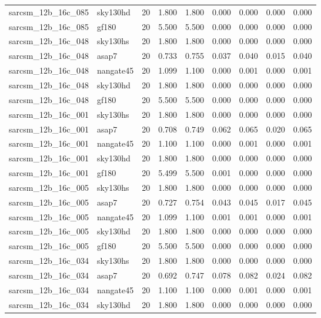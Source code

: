 \begin{tabular}{llrrrrrrr}
sarcsm\_12b\_16c\_085 & sky130hd & 20 & 1.800 & 1.800 & 0.000 & 0.000 & 0.000 & 0.000 \\
sarcsm\_12b\_16c\_085 & gf180 & 20 & 5.500 & 5.500 & 0.000 & 0.000 & 0.000 & 0.000 \\
sarcsm\_12b\_16c\_048 & sky130hs & 20 & 1.800 & 1.800 & 0.000 & 0.000 & 0.000 & 0.000 \\
sarcsm\_12b\_16c\_048 & asap7 & 20 & 0.733 & 0.755 & 0.037 & 0.040 & 0.015 & 0.040 \\
sarcsm\_12b\_16c\_048 & nangate45 & 20 & 1.099 & 1.100 & 0.000 & 0.001 & 0.000 & 0.001 \\
sarcsm\_12b\_16c\_048 & sky130hd & 20 & 1.800 & 1.800 & 0.000 & 0.000 & 0.000 & 0.000 \\
sarcsm\_12b\_16c\_048 & gf180 & 20 & 5.500 & 5.500 & 0.000 & 0.000 & 0.000 & 0.000 \\
sarcsm\_12b\_16c\_001 & sky130hs & 20 & 1.800 & 1.800 & 0.000 & 0.000 & 0.000 & 0.000 \\
sarcsm\_12b\_16c\_001 & asap7 & 20 & 0.708 & 0.749 & 0.062 & 0.065 & 0.020 & 0.065 \\
sarcsm\_12b\_16c\_001 & nangate45 & 20 & 1.100 & 1.100 & 0.000 & 0.001 & 0.000 & 0.001 \\
sarcsm\_12b\_16c\_001 & sky130hd & 20 & 1.800 & 1.800 & 0.000 & 0.000 & 0.000 & 0.000 \\
sarcsm\_12b\_16c\_001 & gf180 & 20 & 5.499 & 5.500 & 0.001 & 0.000 & 0.000 & 0.000 \\
sarcsm\_12b\_16c\_005 & sky130hs & 20 & 1.800 & 1.800 & 0.000 & 0.000 & 0.000 & 0.000 \\
sarcsm\_12b\_16c\_005 & asap7 & 20 & 0.727 & 0.754 & 0.043 & 0.045 & 0.017 & 0.045 \\
sarcsm\_12b\_16c\_005 & nangate45 & 20 & 1.099 & 1.100 & 0.001 & 0.001 & 0.000 & 0.001 \\
sarcsm\_12b\_16c\_005 & sky130hd & 20 & 1.800 & 1.800 & 0.000 & 0.000 & 0.000 & 0.000 \\
sarcsm\_12b\_16c\_005 & gf180 & 20 & 5.500 & 5.500 & 0.000 & 0.000 & 0.000 & 0.000 \\
sarcsm\_12b\_16c\_034 & sky130hs & 20 & 1.800 & 1.800 & 0.000 & 0.000 & 0.000 & 0.000 \\
sarcsm\_12b\_16c\_034 & asap7 & 20 & 0.692 & 0.747 & 0.078 & 0.082 & 0.024 & 0.082 \\
sarcsm\_12b\_16c\_034 & nangate45 & 20 & 1.100 & 1.100 & 0.000 & 0.001 & 0.000 & 0.001 \\
sarcsm\_12b\_16c\_034 & sky130hd & 20 & 1.800 & 1.800 & 0.000 & 0.000 & 0.000 & 0.000 \\

\end{tabular}

